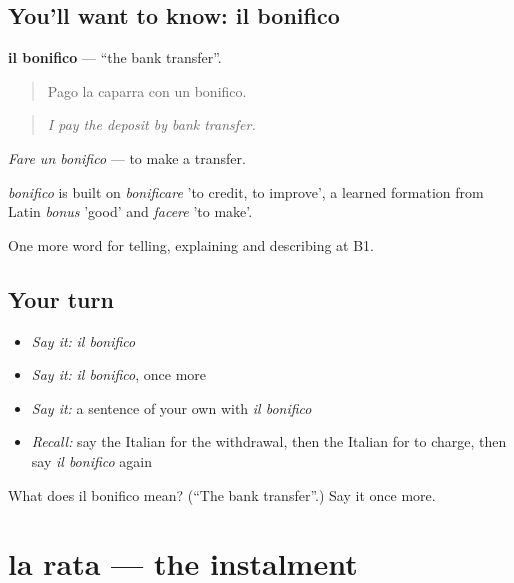 \subsection*{You'll want to know: il bonifico}
\textbf{il bonifico} — \textquotedblleft{}the bank transfer\textquotedblright{}.

\begin{quote}
Pago la caparra con un bonifico.
\end{quote}

\begin{quote}
\emph{I pay the deposit by bank transfer.}
\end{quote}

\emph{Fare un bonifico} — to make a transfer.

\begin{cousinweb}
\emph{bonifico} is built on \emph{bonificare} 'to credit, to improve', a learned formation from Latin \emph{bonus} 'good' and \emph{facere} 'to make'.
\end{cousinweb}

\begin{grammarlens}[title={What you've built}]
One more word for telling, explaining and describing at B1.
\end{grammarlens}

\subsection*{Your turn}
\begin{itemize}
\raggedright
  \item \emph{Say it:} \emph{il bonifico}
  \item \emph{Say it:} \emph{il bonifico}, once more
  \item \emph{Say it:} a sentence of your own with \emph{il bonifico}
  \item \emph{Recall:} say the Italian for the withdrawal, then the Italian for to charge, then say \emph{il bonifico} again
\end{itemize}

\begin{tcolorbox}[breakable,colback=teal!4,colframe=teal!35!black,title={Before you move on}]
What does il bonifico mean? (\textquotedblleft{}The bank transfer\textquotedblright{}.) Say it once more.
\end{tcolorbox}
\section[la rata]{la rata — the instalment}

